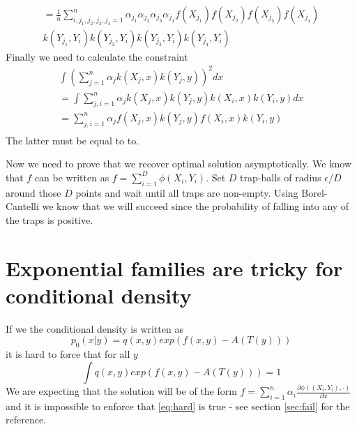 \documentclass[10pt]{article}
\begin{document}
\begin{align}
 =\frac 1 n \sum_{i,j_1,j_2,j_3,j_4=1}^n  \alpha_{j_1} \alpha_{j_2} \alpha_{j_3} \alpha_{j_4}  f(X_{j_1}) f(X_{j_2}) f(X_{j_3}) f(X_{j_4})   \\ 
    k(Y_{j_1},Y_i) k(Y_{j_2},Y_i)k(Y_{j_3},Y_i)k(Y_{j_4},Y_i)
\end{align}
Finally we need to calculate the constraint
\begin{align}
 \int \left( \sum_{j=1}^{n} \alpha_j  k(X_{j},x)  k(Y_{j},y) \right )^2 dx \\ 
 = \int  \sum_{j,i=1}^{n} \alpha_j  k(X_{j},x)  k(Y_{j},y) k(X_{i},x)  k(Y_{i},y)  dx\\
 =   \sum_{j,i=1}^{n} \alpha_j  f(X_{j},x)  k(Y_{j},y) f(X_{i},x)  k(Y_{i},y)  \\
\end{align}
The latter must be equal to to.

Now we need to prove that we recover optimal solution asymptotically. We know that $f$ can be written as $f = \sum_{i=1}^{D} \phi(X_i,Y_i)$. Set $D$ trap-balls of radius $\epsilon/D$ around those $D$ points and wait until all traps are non-empty. Using Borel-Cantelli we know that we will succeed since the probability of falling into any of the traps is positive.          



\section{Exponential families are tricky for conditional density}
If we the conditional density is written as 
\begin{equation}
p_0(x|y) = q(x,y)exp(f(x,y) - A(T(y)) )
\end{equation} 
it is hard to force that for all $y$
\begin{equation}
\label{eq:hard}
\int q(x,y)exp(f(x,y) - A(T(y)) )=1
\end{equation}
We are expecting that the solution will be of the form $f = \sum_{i=1}^n \alpha_i \frac{\partial  \phi( (X_i,Y_i), \cdot)} {\partial x} $ and it is impossible to enforce that \eqref{eq:hard} is true - see section \ref{sec:fail} for the reference.
\end{document}
